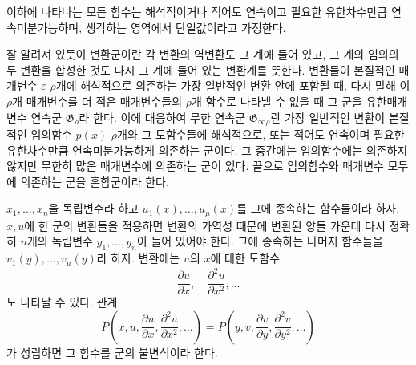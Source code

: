 이하에 나타나는 모든 함수는 해석적이거나 적어도 연속이고 필요한 유한차수만큼 연속미분가능하며, 생각하는 영역에서 단일값이라고 가정한다.

잘 알려져 있듯이 \glqq{}변환군\grqq{}이란 각 변환의 역변환도 그 계에 들어 있고, 그 계의 임의의 두 변환을 합성한 것도 다시 그 계에 들어 있는 변환계를 뜻한다. 변환들이 본질적인 매개변수 \(\varepsilon\) \(\rho\)개에 해석적으로 의존하는 가장 일반적인 변환 안에 포함될 때, 다시 말해 이 \(\rho\)개 매개변수를 더 적은 매개변수들의 \(\rho\)개 함수로 나타낼 수 없을 때 그 군을 유한매개변수 연속군 \(\mathfrak G_\rho\)라 한다. 이에 대응하여 무한 연속군 \(\mathfrak G_{\infty\rho}\)란 가장 일반적인 변환이 본질적인 임의함수 \(p(x)\) \(\rho\)개와 그 도함수들에 해석적으로, 또는 적어도 연속이며 필요한 유한차수만큼 연속미분가능하게 의존하는 군이다. 그 중간에는 임의함수에는 의존하지 않지만 무한히 많은 매개변수에 의존하는 군이 있다. 끝으로 임의함수와 매개변수 모두에 의존하는 군을 혼합군이라 한다.

\(x_1,\ldots,x_n\)을 독립변수라 하고 \(u_1(x),\ldots,u_\mu(x)\)를 그에 종속하는 함수들이라 하자. \(x,u\)에 한 군의 변환들을 적용하면 변환의 가역성 때문에 변환된 양들 가운데 다시 정확히 \(n\)개의 독립변수 \(y_1,\ldots,y_n\)이 들어 있어야 한다. 그에 종속하는 나머지 함수들을 \(v_1(y),\ldots,v_\mu(y)\)라 하자. 변환에는 \(u\)의 \(x\)에 대한 도함수
\[
\frac{\partial u}{\partial x},\quad
\frac{\partial^2u}{\partial x^2},\ldots
\]
도 나타날 수 있다. 관계
\[
P\!\left(x,u,\frac{\partial u}{\partial x},
\frac{\partial^2u}{\partial x^2},\ldots\right)
=
P\!\left(y,v,\frac{\partial v}{\partial y},
\frac{\partial^2v}{\partial y^2},\ldots\right)
\]
가 성립하면 그 함수를 군의 불변식이라 한다.

